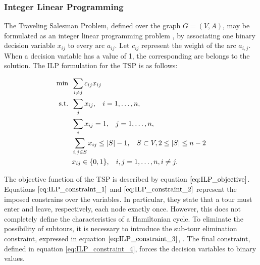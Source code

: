 \subsubsection{Integer Linear Programming}
\label{sec:TDTSP_ILP}

The Traveling Salesman Problem, defined over the graph $G=(V,A)$, may be formulated as an integer linear programming problem \cite{tsp_exact_review}, by associating one binary decision variable $x_{ij}$ to every arc $a_{ij}$. Let $c_{ij}$ represent the weight of the arc $a_{i,j}$. When a decision variable has a value of 1, the corresponding arc belongs to the solution. The ILP formulation for the TSP is as follows:

\begin{align}
  \min  &\hspace{0.5em} \sum_{i \ne j}c_{ij}x_{ij} \label{eq:ILP_objective} \\
  \mathrm{s.t.}   &\hspace{0.5em} \sum_{j} x_{ij}, \hspace{3mm} i = 1, \ldots, n, \label{eq:ILP_constraint_1}\\
  & \hspace{0.5em} \sum_{i} x_{ij} = 1, \hspace{3mm} j = 1, \ldots, n, \label{eq:ILP_constraint_2}\\
  & \hspace{0.5em} \sum_{i,j \in S} x_{ij} \leq |S|-1, \hspace{3mm} S \subset V, 2 \leq |S| \leq n-2 \label{eq:ILP_constraint_3}\\
  & \hspace{0.5em} x_{ij} \in \{0, 1\}, \hspace{3mm} i, j = 1, \ldots, n, i \ne j. \label{eq:ILP_constraint_4}
\end{align}

The objective function of the TSP is described by equation $\ref{eq:ILP_objective}$. Equations $\ref{eq:ILP_constraint_1}$ and $\ref{eq:ILP_constraint_2}$ represent the imposed constrains over the variables. In particular, they state that a tour must enter and leave, respectively, each node exactly once. However, this does not completely define the characteristics of a Hamiltonian cycle. To eliminate the possibility of subtours, it is necessary to introduce the sub-tour elimination constraint, expressed in equation $\ref{eq:ILP_constraint_3}$, . The final constraint, defined in equation \ref{eq:ILP_constraint_4}, forces the decision variables to binary values.



